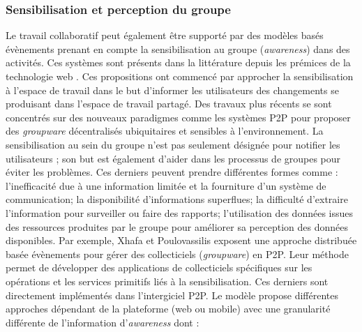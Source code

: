 \subsubsection{Sensibilisation et perception du groupe}
Le travail collaboratif peut également être supporté par des modèles basés 
évènements prenant en compte la sensibilisation au groupe (\textit{awareness}) 
dans des activités. Ces systèmes sont présents dans la littérature depuis les 
prémices de la technologie web \cite{Bentley1997,Steinfield1999,You2001}. Ces 
propositions ont commencé par approcher la sensibilisation à l'espace de travail 
dans le but d'informer les utilisateurs des changements se produisant dans l'espace 
de travail partagé. 
Des travaux plus récents se sont concentrés sur des 
nouveaux paradigmes comme les systèmes \gls{P2P} pour proposer des 
\textit{groupware} décentralisés ubiquitaires et sensibles à l'environnement. La sensibilisation au sein du groupe n'est pas seulement désignée 
pour notifier les utilisateurs ; son but est également d'aider dans les processus de 
groupes pour éviter les problèmes. Ces derniers peuvent prendre différentes 
formes comme :  l'inefficacité due à une information limitée et la fourniture d'un 
système de communication; la disponibilité d'informations superflues; la difficulté 
d'extraire l'information pour surveiller ou faire des rapports; l'utilisation des 
données issues des ressources produites par le groupe pour améliorer sa 
perception des données disponibles. Par exemple, Xhafa et Poulovassilis 
\cite{Xhafa2010} exposent une approche distribuée basée évènements pour gérer 
des collecticiels (\textit{groupware}) en \gls{P2P}. 
Leur méthode permet de développer des applications de collecticiels spécifiques  
sur les opérations et les services primitifs liés à la sensibilisation. Ces derniers 
sont directement implémentés dans l'intergiciel \gls{P2P}. Le modèle propose 
différentes approches dépendant de la plateforme (web ou mobile) avec une 
granularité différente de l'information 
d'\textit{awareness} dont :

